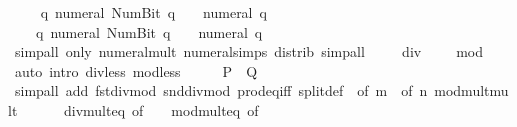 \begin{isabellebody}
\ \ \isamarkupfalse%
\ {\isacharasterisk}{\kern0pt}{\isacharcolon}{\kern0pt}\ {\isachardoublequoteopen}{\isasymAnd}q{\isachardot}{\kern0pt}\ numeral\ {\isacharparenleft}{\kern0pt}Num{\isachardot}{\kern0pt}Bit{}\ q{\isacharparenright}{\kern0pt}\ {\isacharequal}{\kern0pt}\ {}\ {\isacharasterisk}{\kern0pt}\ numeral\ q{\isachardoublequoteclose}\isanewline
\ \ \ \ {\isachardoublequoteopen}{\isasymAnd}q{\isachardot}{\kern0pt}\ numeral\ {\isacharparenleft}{\kern0pt}Num{\isachardot}{\kern0pt}Bit{}\ q{\isacharparenright}{\kern0pt}\ {\isacharequal}{\kern0pt}\ {}\ {\isacharasterisk}{\kern0pt}\ numeral\ q\ {\isacharplus}{\kern0pt}\ {}{\isachardoublequoteclose}\isanewline
\ \ \ \ \isamarkupfalse%
\ {\isacharparenleft}{\kern0pt}simp{\isacharunderscore}{\kern0pt}all\ only{\isacharcolon}{\kern0pt}\ numeral{\isacharunderscore}{\kern0pt}mult\ numeral{\isachardot}{\kern0pt}simps\ distrib{\isacharparenright}{\kern0pt}\ simp{\isacharunderscore}{\kern0pt}all\isanewline
\ \ \isamarkupfalse%
\ {\isachardoublequoteopen}{}\ div\ {}\ {\isacharequal}{\kern0pt}\ {}{\isachardoublequoteclose}\ {\isachardoublequoteopen}{}\ mod\ {}\ {\isacharequal}{\kern0pt}\ {}{\isachardoublequoteclose}\ \isamarkupfalse%
\ {\isacharparenleft}{\kern0pt}auto\ intro{\isacharcolon}{\kern0pt}\ div{\isacharunderscore}{\kern0pt}less\ mod{\isacharunderscore}{\kern0pt}less{\isacharparenright}{\kern0pt}\isanewline
\ \ \isamarkupfalse%
\ \isamarkupfalse%
\ {\isacharquery}{\kern0pt}P\ \ {\isacharquery}{\kern0pt}Q\isanewline
\ \ \ \ \isamarkupfalse%
\ {\isacharparenleft}{\kern0pt}simp{\isacharunderscore}{\kern0pt}all\ add{\isacharcolon}{\kern0pt}\ fst{\isacharunderscore}{\kern0pt}divmod\ snd{\isacharunderscore}{\kern0pt}divmod\ prod{\isacharunderscore}{\kern0pt}eq{\isacharunderscore}{\kern0pt}iff\ split{\isacharunderscore}{\kern0pt}def\ {\isacharasterisk}{\kern0pt}\ {\isacharbrackleft}{\kern0pt}of\ m{\isacharbrackright}{\kern0pt}\ {\isacharasterisk}{\kern0pt}\ {\isacharbrackleft}{\kern0pt}of\ n{\isacharbrackright}{\kern0pt}\ mod{\isacharunderscore}{\kern0pt}mult{\isacharunderscore}{\kern0pt}mult{}\isanewline
\ \ \ \ \ \ div{\isacharunderscore}{\kern0pt}mult{}{\isacharunderscore}{\kern0pt}eq\ {\isacharbrackleft}{\kern0pt}of\ {\isacharunderscore}{\kern0pt}\ {\isacharunderscore}{\kern0pt}\ {}{\isacharbrackright}{\kern0pt}\ mod{\isacharunderscore}{\kern0pt}mult{}{\isacharunderscore}{\kern0pt}eq\ {\isacharbrackleft}{\kern0pt}of\ {\isacharunderscore}{\kern0pt}\ {\isacharunderscore}{\kern0pt}\ {}{\isacharbrackright}{\kern0pt}\isanewline

\end{isabellebody}
